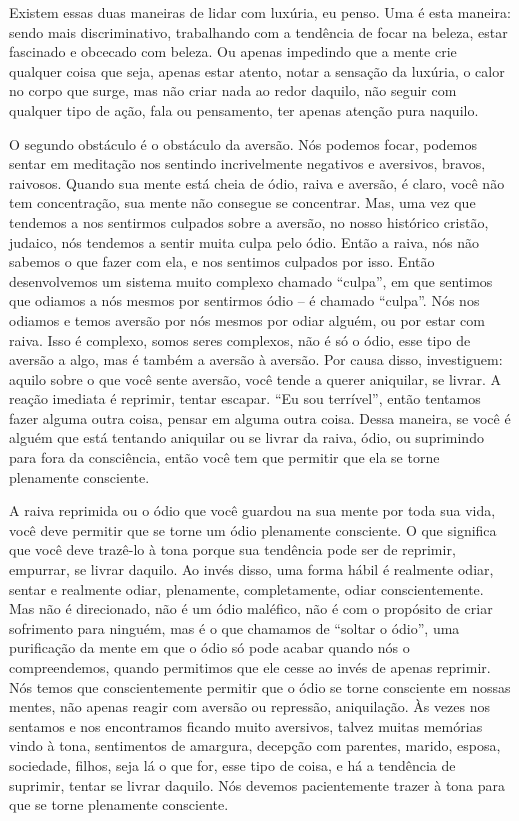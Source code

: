 Existem essas duas maneiras de lidar com luxúria, eu penso. Uma é
esta maneira: sendo mais discriminativo, trabalhando com a tendência de
focar na beleza, estar fascinado e obcecado com beleza. Ou apenas
impedindo que a mente crie qualquer coisa que seja, apenas estar
atento, notar a sensação da luxúria, o calor no corpo que surge, mas
não criar nada ao redor daquilo, não seguir com qualquer tipo de ação,
fala ou pensamento, ter apenas atenção pura naquilo.

O segundo obstáculo é o obstáculo da aversão. Nós podemos focar,
podemos sentar em meditação nos sentindo incrivelmente negativos e
aversivos, bravos, raivosos. Quando sua mente está cheia de ódio, raiva
e aversão, é claro, você não tem concentração, sua mente não consegue
se concentrar. Mas, uma vez que tendemos a nos sentirmos culpados sobre
a aversão, no nosso histórico cristão, judaico, nós tendemos a sentir
muita culpa pelo ódio. Então a raiva, nós não sabemos o que fazer com
ela, e nos sentimos culpados por isso. Então desenvolvemos um sistema
muito complexo chamado “culpa”, em que sentimos que odiamos a nós
mesmos por sentirmos ódio – é chamado “culpa”. Nós nos odiamos e temos
aversão por nós mesmos por odiar alguém, ou por estar com raiva. Isso é
complexo, somos seres complexos, não é só o ódio, esse tipo de aversão
a algo, mas é também a aversão à aversão. Por causa disso, investiguem:
aquilo sobre o que você sente aversão, você tende a querer aniquilar,
se livrar. A reação imediata é reprimir, tentar escapar. “Eu sou
terrível”, então tentamos fazer alguma outra coisa, pensar em alguma
outra coisa. Dessa maneira, se você é alguém que está tentando
aniquilar ou se livrar da raiva, ódio, ou suprimindo para fora da
consciência, então você tem que permitir que ela se torne plenamente
consciente.

A raiva reprimida ou o ódio que você guardou na sua mente por toda
sua vida, você deve permitir que se torne um ódio plenamente
consciente. O que significa que você deve trazê-lo à tona porque sua
tendência pode ser de reprimir, empurrar, se livrar daquilo. Ao invés
disso, uma forma hábil é realmente odiar, sentar e realmente odiar,
plenamente, completamente, odiar conscientemente. Mas não é
direcionado, não é um ódio maléfico, não é com o propósito de criar
sofrimento para ninguém, mas é o que chamamos de “soltar o ódio”, uma
purificação da mente em que o ódio só pode acabar quando nós o
compreendemos, quando permitimos que ele cesse ao invés de apenas
reprimir. Nós temos que conscientemente permitir que o ódio se torne
consciente em nossas mentes, não apenas reagir com aversão ou
repressão, aniquilação. Às vezes nos sentamos e nos encontramos ficando
muito aversivos, talvez muitas memórias vindo à tona, sentimentos de
amargura, decepção com parentes, marido, esposa, sociedade, filhos,
seja lá o que for, esse tipo de coisa, e há a tendência de suprimir,
tentar se livrar daquilo. Nós devemos pacientemente trazer à tona para
que se torne plenamente consciente. 

